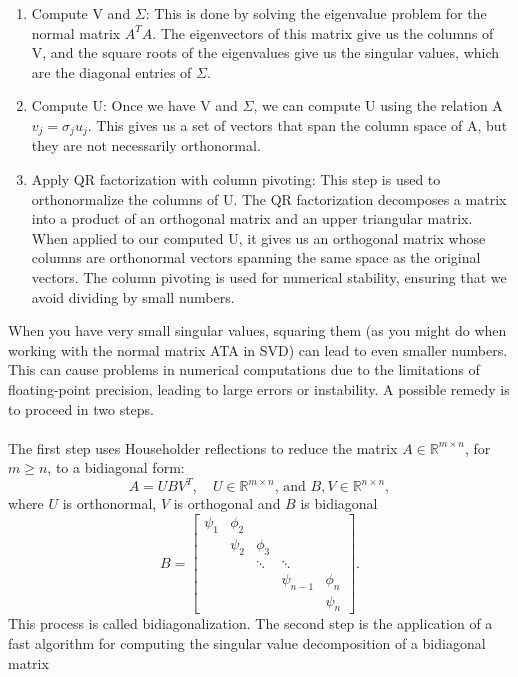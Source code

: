 \documentclass[11pt]{book}
\begin{document}
\begin{enumerate}  
\item Compute V and $\Sigma$: This is done by solving the eigenvalue problem for the normal matrix $A^TA$. The eigenvectors of this matrix give us the columns of V, and the square roots of the eigenvalues give us the singular values, which are the diagonal entries of $\Sigma$.  
  
\item Compute U: Once we have V and $\Sigma$, we can compute U using the relation A $v_j = \sigma_j u_j$. This gives us a set of vectors that span the column space of A, but they are not necessarily orthonormal.  
  
\item Apply QR factorization with column pivoting: This step is used to orthonormalize the columns of U. The QR factorization decomposes a matrix into a product of an orthogonal matrix and an upper triangular matrix. When applied to our computed U, it gives us an orthogonal matrix whose columns are orthonormal vectors spanning the same space as the original vectors. The column pivoting is used for numerical stability, ensuring that we avoid dividing by small numbers.  
\end{enumerate}  
When you have very small singular values, squaring them (as you might do when working with the normal matrix ATA in SVD) can lead to even smaller numbers. This can cause problems in numerical computations due to the limitations of floating-point precision, leading to large errors or instability. A possible remedy is to proceed in two steps.\\ \\
The first step uses Householder reflections to reduce the matrix $A \in \mathbb{R}^{m \times n}$, for $m \geq n$, to a bidiagonal form:
$$
A=U B V^T, \quad U \in \mathbb{R}^{m \times n} \text {, and } B, V \in \mathbb{R}^{n \times n},
$$
where $U$ is orthonormal, $V$ is orthogonal and $B$ is bidiagonal
$$
B=\left[\begin{array}{ccccc}
\psi_1 & \phi_2 & & & \\
& \psi_2 & \phi_3 & & \\
& & \ddots & \ddots & \\
& & & \psi_{n-1} & \phi_n \\
& & & & \psi_n
\end{array}\right] .
$$
This process is called bidiagonalization. The second step is the application of a fast algorithm for computing the singular value decomposition of a bidiagonal matrix
\end{document}
